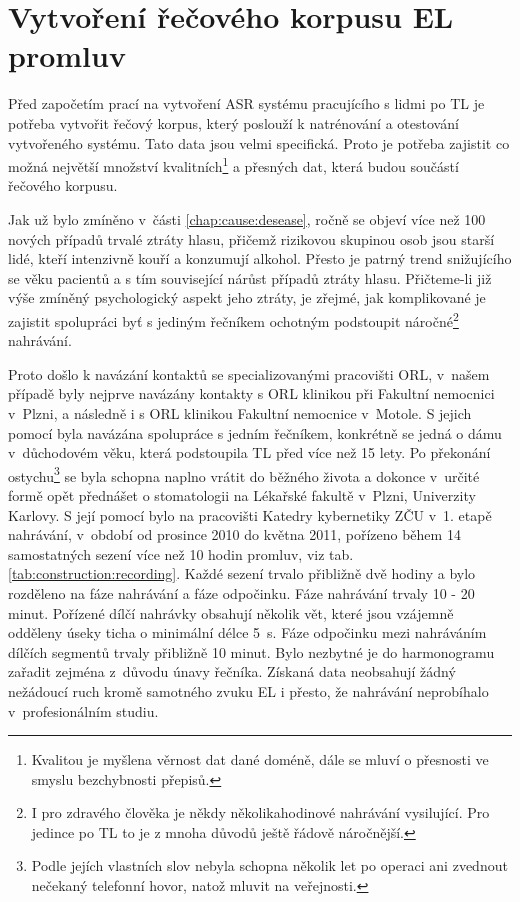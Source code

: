 \section{Vytvoření řečového korpusu EL promluv}
\label{chap:construction:corpus}

Před započetím prací na vytvoření ASR systému pracujícího s lidmi po TL je potřeba vytvořit řečový korpus, který poslouží k natrénování a otestování vytvořeného systému. Tato data jsou velmi specifická. Proto je potřeba zajistit co možná největší množství kvalitních\footnote{Kvalitou je myšlena věrnost dat dané doméně, dále se mluví o přesnosti ve smyslu bezchybnosti přepisů.} a přesných dat, která budou součástí řečového korpusu.

Jak už bylo zmíněno v~části \ref{chap:cause:desease}, ročně se objeví více než 100 nových případů trvalé ztráty hlasu, přičemž rizikovou skupinou osob jsou starší lidé, kteří intenzivně kouří a konzumují alkohol. Přesto je patrný trend snižujícího se věku pacientů a s tím související nárůst případů ztráty hlasu. Přičteme-li již výše zmíněný psychologický aspekt jeho ztráty, je zřejmé, jak komplikované je zajistit spolupráci byť s jediným řečníkem ochotným podstoupit náročné\footnote{I pro zdravého člověka je někdy několikahodinové nahrávání vysilující. Pro jedince po TL to je z mnoha důvodů ještě řádově náročnější.} nahrávání.

Proto došlo k navázání kontaktů se specializovanými pracovišti ORL, v~našem případě byly nejprve navázány kontakty s ORL klinikou při Fakultní nemocnici v~Plzni, a následně i s ORL klinikou Fakultní nemocnice v~Motole.
S jejich pomocí byla navázána spolupráce s jedním řečníkem, konkrétně se jedná o dámu v~důchodovém věku, která podstoupila TL před více než 15 lety.
Po překonání ostychu\footnote{Podle jejích vlastních slov nebyla schopna několik let po operaci ani zvednout nečekaný telefonní hovor, natož mluvit na veřejnosti.} se byla schopna naplno vrátit do běžného života a dokonce v~určité formě opět přednášet o stomatologii na Lékařské fakultě v~Plzni, Univerzity Karlovy.
S její pomocí bylo na pracovišti Katedry kybernetiky ZČU v~1. etapě nahrávání, v~období od prosince 2010 do května 2011, pořízeno během 14 samostatných sezení více než 10 hodin promluv, viz tab. \ref{tab:construction:recording}.
Každé sezení trvalo přibližně dvě hodiny a bylo rozděleno na fáze nahrávání a fáze odpočinku. Fáze nahrávání trvaly 10 - 20 minut.
Pořízené dílčí nahrávky obsahují několik vět, které jsou vzájemně odděleny úseky ticha o minimální délce 5~s. Fáze odpočinku mezi nahráváním dílčích segmentů trvaly přibližně 10 minut.
Bylo nezbytné je do harmonogramu zařadit zejména z~důvodu únavy řečníka.
Získaná data neobsahují žádný nežádoucí ruch kromě samotného zvuku EL i přesto, že nahrávání neprobíhalo v~profesionálním studiu.


